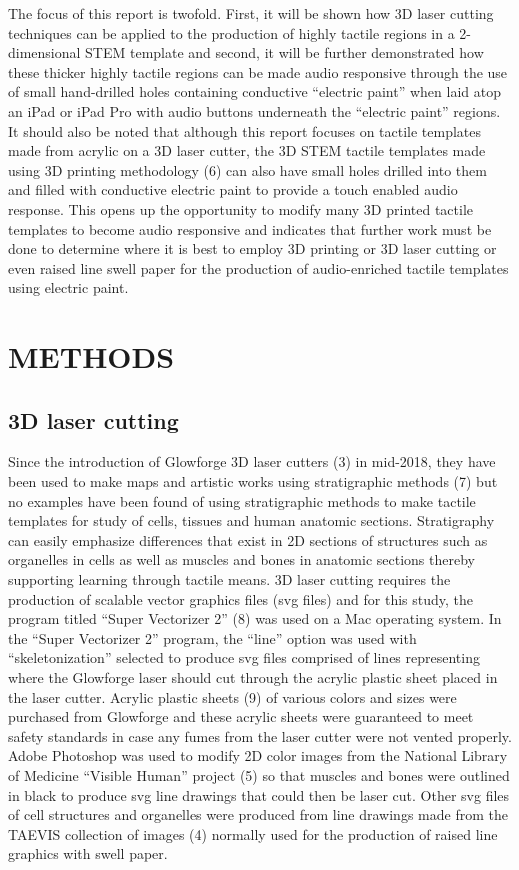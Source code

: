 \documentclass[11.5pt]{sig-alternate} %
\begin{document}
\begin{large}
The focus of this report is twofold.  First, it will be shown how 3D laser cutting techniques can be applied to the production of highly tactile regions in a 2-dimensional STEM template and second, it will be further demonstrated how these thicker highly tactile regions can be made audio responsive through the use of small hand-drilled holes containing conductive “electric paint” when laid atop an iPad or iPad Pro with audio buttons underneath the “electric paint” regions.  It should also be noted that although this report focuses on tactile templates made from acrylic on a 3D laser cutter, the 3D STEM tactile templates made using 3D printing methodology (6) can also have small holes drilled into them and filled with conductive electric paint to provide a touch enabled audio response.  This opens up the opportunity to modify many 3D printed tactile templates to become audio responsive and indicates that further work must be done to determine where it is best to employ 3D printing or 3D laser cutting or even raised line swell paper for the production of audio-enriched tactile templates using electric paint.

\section*{METHODS}
 
\subsection*{3D laser cutting}

Since the introduction of Glowforge 3D laser cutters (3) in mid-2018, they have been used to make maps and artistic works using stratigraphic methods (7) but no examples have been found of using stratigraphic methods to make tactile templates for study of cells, tissues and human anatomic sections.  Stratigraphy can easily emphasize differences that exist in 2D sections of structures such as organelles in cells as well as muscles and bones in anatomic sections thereby supporting learning through tactile means.  3D laser cutting requires the production of scalable vector graphics files (svg files) and for this study, the program titled “Super Vectorizer 2” (8) was used on a Mac operating system.  In the “Super Vectorizer 2” program, the “line” option was used with “skeletonization” selected to produce svg files comprised of lines representing where the Glowforge laser should cut through the acrylic plastic sheet placed in the laser cutter.  Acrylic plastic sheets (9) of various colors and sizes were purchased from Glowforge and these acrylic sheets were guaranteed to meet safety standards in case any fumes from the laser cutter were not vented properly.  Adobe Photoshop was used to modify 2D color images from the National Library of Medicine “Visible Human” project (5) so that muscles and bones were outlined in black to produce svg line drawings that could then be laser cut.  Other svg files of cell structures and organelles were produced from line drawings made from the TAEVIS collection of images (4) normally used for the production of raised line graphics with swell paper.


\end{large}
\end{document}
